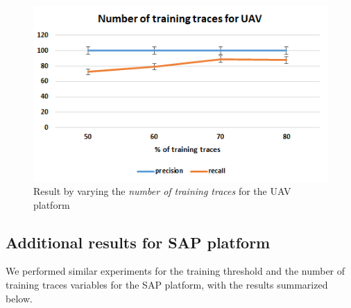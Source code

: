 \begin{itemize}
\begin{figure}[ht]
    \centering
    \includegraphics[scale=0.75,keepaspectratio = true]{Graphics/UAV_traces.png}
    \caption{Result by varying the \textit{number of training traces} for the UAV platform}
    \label{fig:UAV_traces}
\end{figure}

\end{itemize}

\subsection{Additional results for SAP platform}
We performed similar experiments for the training threshold and the number of training traces variables for the \ac{SAP} platform, with the results summarized below.

